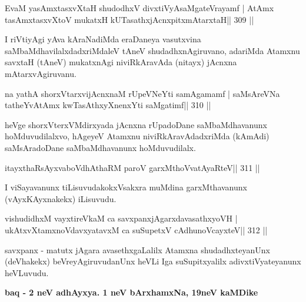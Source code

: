 \begin{shl}
EvaM yasAmxtasxvXtaH shudodhxV divxtiVyAsaMgateVrayamf |
AtAmx tasAmxtasxvXtoV mukatxH kUTasathxjAcnxpitxmAtarxtaH\footnotemark[1]\hfill || 309 ||
\end{shl}

\begin{artha}
I riVtiyAgi yAva kAraNadiMda eraDaneya vasutxvina saMbaMdhavilalxdadxriMdaleV tAneV shudadhxnAgiruvano, adariMda Atamxnu savxtaH (tAneV) mukatxnAgi niviRkAravAda (nitayx) jAcnxna mAtarxvAgiruvanu.
\end{artha}

\begin{shl}
na yathA shorxVtarxvijAcnxnaM rUpeVNeYti samAgamamf |
saMsAreVNa tatheYvA\s\s tAmx kwTasAthxyXnenxYti saMgatimf\hfill || 310 ||
\end{shl}

\begin{artha}
heVge shorxVterxVMdirxyada jAcnxna rUpadoDane saMbaMdhavanunx hoMduvudilalxvo, hAgeyeV Atamxnu niviRkAravAdadxriMda (kAmAdi) saMsAradoDane saMbaMdhavanunx hoMduvudilalx.
\end{artha}

\begin{shl}
itayxthaRsAyxvaboVdhAthaRM paroV garxMthoV\s vatAyaRteV\hfill || 311 ||
\end{shl}

\begin{artha}
I viSayavanunx tiLisuvudakokxVsakxra muMdina garxMthavanunx (vAyxKAyxnakekx) iLisuvudu.
\end{artha}

\begin{shl}
vishudidhxM vayxtireVkaM ca savxpanxjAgarxdavasathxyoVH |
ukAtxvX\s\s tamxnoV\s davxyatavxM ca suSupetxV cAdhunoVcayxteV\hfill || 312 ||
\end{shl}

\begin{artha}
savxpanx - matutx jAgara avasethxgaLalilx Atamxna shudadhxteyanUnx 
(deVhakekx) beVreyAgiruvudanUnx heVLi Iga suSupitxyalilx adivxtiVyateyanunx heVLuvudu.
\end{artha}

\begin{center}
{\large\bf baq - 2 neV adhAyxya. 1 neV bArxhamxNa, 19neV kaMDike}
\end{center}

